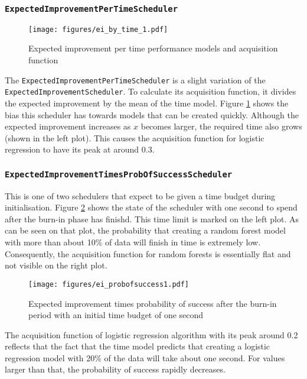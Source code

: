 \documentclass[a4paper,12pt,twoside,openright]{report}
\begin{document}
\subsubsection{\texttt{ExpectedImprovementPerTimeScheduler}}
\begin{figure}
\centering
  \texttt{[image: figures/ei\_by\_time\_1.pdf]}
  \caption{Expected improvement per time performance models and acquisition function}
  \label{sched:expimprpertime01}
\end{figure}

The \texttt{ExpectedImprovementPerTimeScheduler} is a slight variation of the \texttt{ExpectedImprovementScheduler}. To calculate its acquisition function, it divides the expected improvement by the mean of the time model. Figure \ref{sched:expimprpertime01} shows the bias this scheduler has towards models that can be created quickly. Although the expected improvement increases as $x$ becomes larger, the required time also grows (shown in the left plot). This causes the acquisition function for logistic regression to have its peak at around $0.3$.


\subsubsection{\texttt{ExpectedImprovementTimesProbOfSuccessScheduler}}

This is one of two schedulers that expect to be given a time budget during initialisation. Figure \ref{sched:expimprtimeprob01} shows the state of the scheduler with one second to spend after the burn-in phase has finishd. This time limit is marked on the left plot. As can be seen on that plot, the probability that creating a random forest model with more than about 10\% of data will finish in time is extremely low. Consequently, the acquisition function for random forests is essentially flat and not visible on the right plot.

\begin{figure}[h]
\centering
  \texttt{[image: figures/ei\_probofsuccess1.pdf]}
  \caption{Expected improvement times probability of success after the burn-in period with an initial time budget of one second}
  \label{sched:expimprtimeprob01}
\end{figure}

The acquisition function of logistic regression algorithm with its peak around 0.2 reflects that the fact that the time model predicts that creating a logistic regression model with 20\% of the data will take about one second. For values larger than that, the probability of success rapidly decreases.
\end{document}

